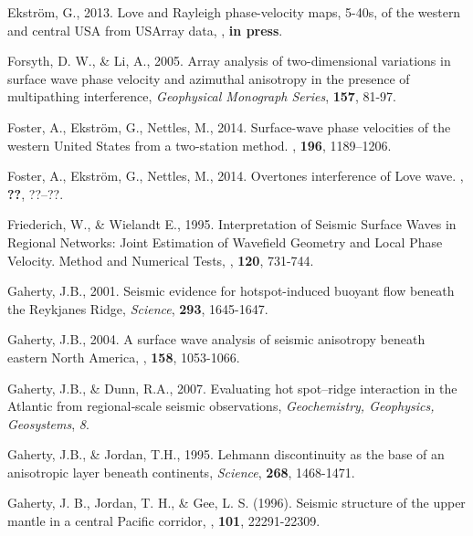 \documentclass[referee]{gji}
\begin{document}
\begin{thebibliography}{}
	   Ekstr\"{o}m, G., 2013. Love and Rayleigh phase-velocity maps, 5-40s, of the western and central USA from USArray data, \textit{\epsl}, \textbf{in press}.

	   Forsyth, D. W., \& Li, A., 2005. Array analysis of two-dimensional variations in surface wave phase velocity and azimuthal anisotropy in the presence of multipathing interference, \textit{Geophysical Monograph Series}, \textbf{157}, 81-97.

	   Foster, A., Ekstr\"{o}m, G., Nettles, M., 2014. Surface-wave phase velocities of the western United States from a two-station method. \textit{\gji}, \textbf{196}, 1189–1206.

	   Foster, A., Ekstr\"{o}m, G., Nettles, M., 2014. Overtones interference of Love wave. \textit{}, \textbf{??}, ??–??.

   Friederich, W., \& Wielandt E., 1995. Interpretation of Seismic Surface Waves in Regional Networks: Joint Estimation of Wavefield Geometry and Local Phase Velocity. Method and Numerical Tests, \textit{\gjras}, \textbf{120}, 731-744.

	   Gaherty, J.B., 2001. Seismic evidence for hotspot-induced buoyant flow beneath the Reykjanes Ridge, \textit{Science}, \textbf{293}, 1645-1647.

	   Gaherty, J.B., 2004. A surface wave analysis of seismic anisotropy beneath eastern North America, \textbf{\gji}, \textbf{158}, 1053-1066.

	   Gaherty, J.B., \& Dunn, R.A., 2007. Evaluating hot spot–ridge interaction in the Atlantic from regional‐scale seismic observations, \textit{Geochemistry, Geophysics, Geosystems}, \textit{8}.

	   Gaherty, J.B., \& Jordan, T.H., 1995. Lehmann discontinuity as the base of an anisotropic layer beneath continents, \textit{Science}, \textbf{268}, 1468-1471.

	   Gaherty, J. B., Jordan, T. H., \& Gee, L. S. (1996). Seismic structure of the upper mantle in a central Pacific corridor, \textit{\jgr}, \textbf{101}, 22291-22309.


\end{thebibliography}
\end{document}
